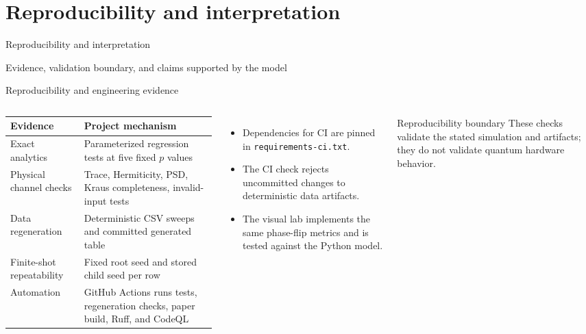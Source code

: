 \documentclass[10pt,aspectratio=169]{beamer}
\newcommand{\sourcefoot}[1]{}
\begin{document}
\section{Reproducibility and interpretation}
\begin{frame}[plain]
\vfill\centering
{\color{quantumblue}\LARGE Reproducibility and interpretation}\par\vspace{3mm}
\large Evidence, validation boundary, and claims supported by the model
\vfill
\end{frame}

\begin{frame}[t]{Reproducibility and engineering evidence}
\begin{columns}[T]
\begin{tabular}{@{}p{}p{}@{}}
\toprule
Evidence & Project mechanism\\
\midrule
Exact analytics & Parameterized regression tests at five fixed $p$ values\\
Physical channel checks & Trace, Hermiticity, PSD, Kraus completeness, invalid-input tests\\
Data regeneration & Deterministic CSV sweeps and committed generated table\\
Finite-shot repeatability & Fixed root seed and stored child seed per row\\
Automation & GitHub Actions runs tests, regeneration checks, paper build, Ruff, and CodeQL\\
\bottomrule
\end{tabular}
\begin{itemize}
  \item Dependencies for CI are pinned in \texttt{requirements-ci.txt}.
  \item The CI check rejects uncommitted changes to deterministic data artifacts.
  \item The visual lab implements the same phase-flip metrics and is tested against the Python model.
\end{itemize}
\begin{block}{Reproducibility boundary}
These checks validate the stated simulation and artifacts; they do not validate quantum hardware behavior.
\end{block}
\end{columns}
\sourcefoot{Workflows: \texttt{.github/workflows}; tests: \texttt{tests/}; build notes: \texttt{docs/reproducibility.md}.}
\end{frame}
\end{document}
